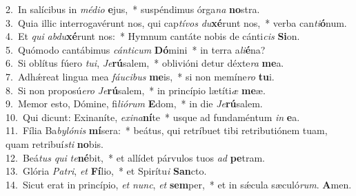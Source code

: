 {2.~}In salícibus in \textit{mé}\textit{di}\textit{o} \textbf{e}jus,~* suspéndimus órga\textit{na} \textbf{no}stra.\\
{3.~}Quia illic interrogavérunt nos, qui cap\textit{tí}\textit{vos} \textit{du}\textbf{xé}runt nos,~* verba can\textit{ti}\textbf{ó}num.\\
{4.~}Et \textit{qui} \textit{ab}\textit{du}\textbf{xé}runt nos:~* Hymnum cantáte nobis de cánti\textit{cis} \textbf{Si}on.\\
{5.~}Quómodo cantábimus \textit{cán}\textit{ti}\textit{cum} \textbf{Dó}mini~* in terra a\textit{li}\textbf{é}na?\\
{6.~}Si oblítus fúero \textit{tu}\textit{i}, \textit{Je}\textbf{rú}salem,~* oblivióni detur déxte\textit{ra} \textbf{me}a.\\
{7.~}Adhǽreat lingua mea \textit{fáu}\textit{ci}\textit{bus} \textbf{me}is,~* si non memíne\textit{ro} \textbf{tu}i.\\
{8.~}Si non proposú\textit{e}\textit{ro} \textit{Je}\textbf{rú}salem,~* in princípio lætíti\textit{æ} \textbf{me}æ.\\
{9.~}Memor esto, Dómine, fi\textit{li}\textit{ó}\textit{rum} \textbf{E}dom,~* in die \textit{Je}\textbf{rú}salem.\\
{10.~}Qui dicunt: Exinaníte, \textit{e}\textit{xi}\textit{na}\textbf{ní}te~* usque ad fundaméntum \textit{in} \textbf{e}a.\\
{11.~}Fília Ba\textit{by}\textit{ló}\textit{nis} \textbf{mí}sera:~* beátus, qui retríbuet tibi retributiónem tuam, quam retribuí\textit{sti} \textbf{no}bis.\\
{12.~}Beá\textit{tus} \textit{qui} \textit{te}\textbf{né}bit,~* et allídet párvulos tuos \textit{ad} \textbf{pe}tram.\\
{13.~}Glória \textit{Pa}\textit{tri}, \textit{et} \textbf{Fí}lio,~* et Spirítu\textit{i} \textbf{San}cto.\\
{14.~}Sicut erat in princípio, \textit{et} \textit{nunc}, \textit{et} \textbf{sem}per,~* et in sǽcula sæculó\textit{rum}. \textbf{A}men.\\

